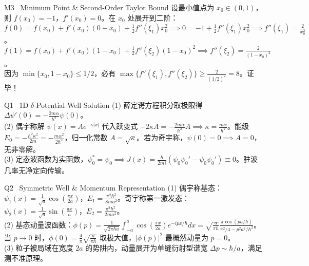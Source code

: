 \documentclass[a4paper,11pt]{article}
\begin{document}
\vspace{3pt}

\begin{solution}{M3 \textperiodcentered\ Minimum Point \& Second-Order Taylor Bound}
设最小值点为 $x_0 \in (0,1)$，则 $f(x_0) = -1$，$f'(x_0) = 0$。在 $x_0$ 处展开到二阶：\\
$f(0) = f(x_0) + f'(x_0)(0-x_0) + \frac{1}{2}f''(\xi_1)x_0^2 \implies 0 = -1 + \frac{1}{2}f''(\xi_1)x_0^2 \implies f''(\xi_1) = \frac{2}{x_0^2}$。\\
$f(1) = f(x_0) + f'(x_0)(1-x_0) + \frac{1}{2}f''(\xi_2)(1-x_0)^2 \implies f''(\xi_2) = \frac{2}{(1-x_0)^2}$。\\
因为 $\min\{x_0, 1-x_0\} \le 1/2$，必有 $\max\{f''(\xi_1), f''(\xi_2)\} \ge \frac{2}{(1/2)^2} = 8$。证毕！
\end{solution}

\vspace{3pt}

\begin{solution}{Q1 \textperiodcentered\ 1D $\delta$-Potential Well Solution}
(1) 薛定谔方程积分取极限得 $\Delta\psi'(0) = -\frac{2m\alpha}{\hbar^2}\psi(0)$。\\
(2) 偶宇称解 $\psi(x) = Ae^{-\kappa|x|}$ 代入跃变式 $-2\kappa A = -\frac{2m\alpha}{\hbar^2}A \implies \kappa = \frac{m\alpha}{\hbar^2}$。能级 $E_0 = -\frac{\hbar^2\kappa^2}{2m} = -\frac{m\alpha^2}{2\hbar^2}$，归一化常数 $A = \sqrt{\kappa}$。若为奇宇称，$\psi(0)=0 \implies A=0$，无非零解。\\
(3) 定态波函数为实函数，$\psi_0^*=\psi_0 \implies J(x) = \frac{\hbar}{2mi}(\psi_0\psi_0' - \psi_0\psi_0') \equiv 0$。驻波几率无净定向传输。
\end{solution}

\vspace{3pt}

\begin{solution}{Q2 \textperiodcentered\ Symmetric Well \& Momentum Representation}
(1) 偶宇称基态：$\psi_1(x) = \frac{1}{\sqrt{a}}\cos\left(\frac{\pi x}{2a}\right)$，$E_1 = \frac{\pi^2\hbar^2}{8ma^2}$。奇宇称第一激发态：$\psi_2(x) = \frac{1}{\sqrt{a}}\sin\left(\frac{\pi x}{a}\right)$，$E_2 = \frac{\pi^2\hbar^2}{2ma^2}$。\\
(2) 基态动量波函数：$\phi(p) = \frac{1}{\sqrt{2\pi\hbar a}}\int_{-a}^a \cos\left(\frac{\pi x}{2a}\right)e^{-ipx/\hbar}dx = \sqrt{\frac{a}{\pi\hbar}}\frac{\pi\cos(pa/\hbar)}{\pi^2/4 - p^2a^2/\hbar^2}$。\\
当 $p \to 0$ 时，$\phi(0) = \frac{4}{\pi}\sqrt{\frac{a}{\pi\hbar}}$ 取极大值，$|\phi(p)|^2$ 最概然动量为 $p = 0$。\\
(3) 粒子被局域在宽度 $2a$ 的势阱内，动量展开为单缝衍射型谱宽 $\Delta p \sim \hbar/a$，满足测不准原理。
\end{solution}
\end{document}
